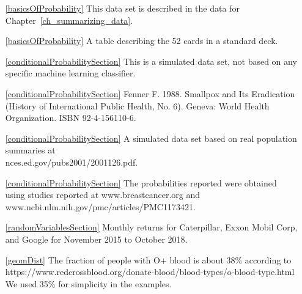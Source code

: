 \begin{itemize}
\item[\ref{basicsOfProbability}]
    This data set is described in
    the data for Chapter~\ref{ch_summarizing_data}.
\item[\ref{basicsOfProbability}]
    A table describing the 52 cards in a standard deck.

\item[\ref{conditionalProbabilitySection}]
    This is a simulated data set, not based on
    any specific machine learning classifier.
\item[\ref{conditionalProbabilitySection}]
    Fenner F. 1988.
    Smallpox and Its Eradication
    (History of International Public Health, No. 6).
    Geneva: World Health Organization. ISBN 92-4-156110-6.
\item[\ref{conditionalProbabilitySection}]
    A simulated data set based on real population summaries at\\
        {nces.ed.gov/pubs2001/2001126.pdf}.

\item[\ref{conditionalProbabilitySection}]
    The probabilities reported were obtained using studies
    reported at
        {www.breastcancer.org}
    and 
        {www.ncbi.nlm.nih.gov/pmc/articles/PMC1173421}. 

\item[\ref{randomVariablesSection}]
    Monthly returns for Caterpillar, Exxon Mobil Corp,
    and Google for November 2015 to October 2018.

\item[\ref{geomDist}]
    The fraction of people with O+ blood is about 38\% according to \\
        {https://www.redcrossblood.org/donate-blood/blood-types/o-blood-type.html} \\
    We used 35\% for simplicity in the examples.

\end{itemize}


